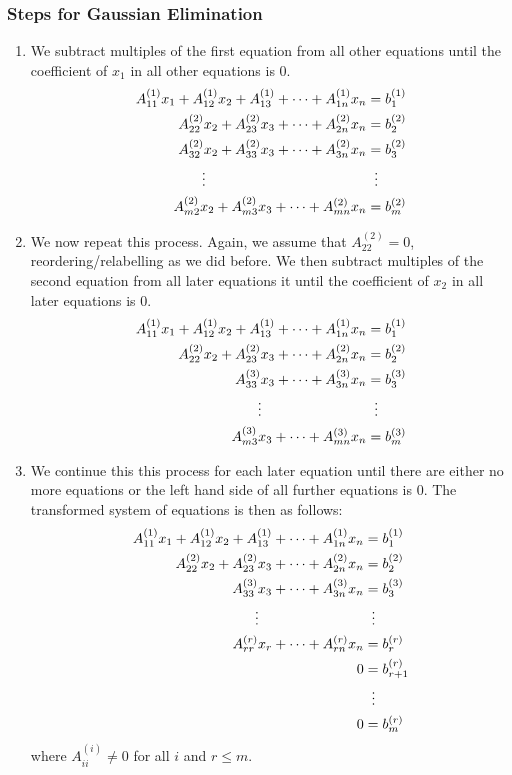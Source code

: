 \documentclass[../main.tex]{subfiles}
\begin{document}
\subsubsection{Steps for Gaussian Elimination}
\begin{enumerate}
  \item We subtract multiples of the first equation from all other equations until the coefficient of $x_1$ in all other equations is 0.
    \begin{align*}
      A^{(1)}_{1 1}x_1 + A^{(1)}_{1 2}x_2 + A^{(1)}_{1 3} + \cdots + A^{(1)}_{1 n}x_n &= b^{(1)}_1 \\
      A^{(2)}_{2 2}x_2 + A^{(2)}_{2 3}x_3 + \cdots + A^{(2)}_{2 n}x_n &= b^{(2)}_2 \\
      A^{(2)}_{3 2}x_2 + A^{(2)}_{3 3}x_3 + \cdots + A^{(2)}_{3 n}x_n &= b^{(2)}_3 \\
      \vdots \hspace{11.5em}&\;\;\vdots \\
      A^{(2)}_{m 2}x_2 + A^{(2)}_{m 3}x_3 + \cdots + A^{(2)}_{m n}x_n &= b^{(2)}_m
    \end{align*}
  \item We now repeat this process.
    Again, we assume that $A^{(2)}_{2 2} = 0$, reordering/relabelling as we did before.
    We then subtract multiples of the second equation from all later equations it until the coefficient of $x_2$ in all later equations is 0.
    \begin{align*}
      A^{(1)}_{1 1}x_1 + A^{(1)}_{1 2}x_2 + A^{(1)}_{1 3} + \cdots + A^{(1)}_{1 n}x_n &= b^{(1)}_1 \\
      A^{(2)}_{2 2}x_2 + A^{(2)}_{2 3}x_3 + \cdots + A^{(2)}_{2 n}x_n &= b^{(2)}_2 \\
      A^{(3)}_{3 3}x_3 + \cdots + A^{(3)}_{3 n}x_n &= b^{(3)}_3 \\
      \vdots \hspace{7.5em}&\;\;\vdots \\
      A^{(3)}_{m 3}x_3 + \cdots + A^{(3)}_{m n}x_n &= b^{(3)}_m
    \end{align*}
  \item We continue this this process for each later equation until there are either no more equations or the left hand side of all further equations is 0.
    The transformed system of equations is then as follows:
    \begin{align*}
      A^{(1)}_{1 1}x_1 + A^{(1)}_{1 2}x_2 + A^{(1)}_{1 3} + \cdots + A^{(1)}_{1 n}x_n &= b^{(1)}_1 \\
      A^{(2)}_{2 2}x_2 + A^{(2)}_{2 3}x_3 + \cdots + A^{(2)}_{2 n}x_n &= b^{(2)}_2 \\
      A^{(3)}_{3 3}x_3 + \cdots + A^{(3)}_{3 n}x_n &= b^{(3)}_3 \\
      \vdots \hspace{7.5em}&\;\;\vdots \\
      A^{(r)}_{r r}x_r + \cdots + A^{(r)}_{r n}x_n &= b^{(r)}_r \\
      0 &= b^{(r)}_{r + 1} \\
      &\;\;\vdots \\
      0 &= b^{(r)}_{m}
    \end{align*}
    where $A^{(i)}_{i i} \neq 0$ for all $i$ and $r \leq m$.
\end{enumerate}
\end{document}

